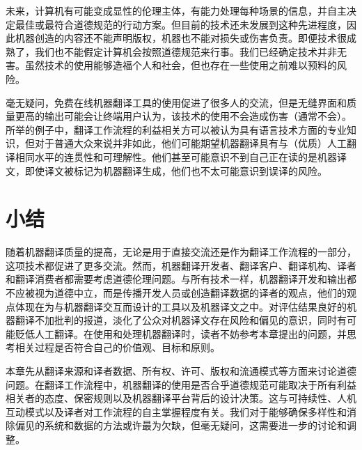 \documentclass[output=paper]{langscibook}
\begin{document}
未来，计算机有可能变成显性的伦理主体，有能力处理每种场景的信息，并自主决定最佳或最符合道德规范的行动方案。但目前的技术还未发展到这种先进程度，因此机器创造的内容还不能声明版权，机器也不能对损失或伤害负责。即便技术很成熟了，我们也不能假定计算机会按照道德规范来行事。我们已经确定技术并非无害。虽然技术的使用能够造福个人和社会，但也存在一些使用之前难以预料的风险。

毫无疑问，免费在线机器翻译工具的使用促进了很多人的交流，但是无缝界面和质量更高的输出可能会让终端用户认为，该技术的使用不会造成伤害（通常不会）。所举的例子中，翻译工作流程的利益相关方可以被认为具有语言技术方面的专业知识，但对于普通大众来说并非如此，他们可能期望机器翻译具有与（优质）人工翻译相同水平的连贯性和可理解性。他们甚至可能意识不到自己正在读的是机器译文，即使译文被标记为机器翻译生成，他们也不太可能意识到误译的风险。


\section{{{小结}}}\label{sec:moorkens:7}
随着机器翻译质量的提高，无论是用于直接交流还是作为翻译工作流程的一部分，这项技术都促进了更多交流。然而，机器翻译开发者、翻译客户、翻译机构、译者和翻译消费者都需要考虑道德伦理问题。与所有技术一样，机器翻译开发和输出都不应被视为道德中立，而是传播开发人员或创造翻译数据的译者的观点，他们的观点体现在为与机器翻译交互而设计的工具以及机器译文之中。对评估结果良好的机器翻译不加批判的报道，淡化了公众对机器译文存在风险和偏见的意识，同时有可能贬低人工翻译。在使用和处理机器翻译时，读者不妨参考本章提出的问题，并思考相关过程是否符合自己的价值观、目标和原则。

本章先从翻译来源和译者数据、所有权、许可、版权和流通模式等方面来讨论道德问题。在翻译工作流程中，机器翻译的使用是否合乎道德规范可能取决于所有利益相关者的态度、保密规则以及机器翻译平台背后的设计决策。这与可持续性、人机互动模式以及译者对工作流程的自主掌握程度有关。我们对于能够确保多样性和消除偏见的系统和数据的方法或许最为欠缺，但毫无疑问，这需要进一步的讨论和调整。\largerpage

\printbibliography[heading=subbibliography,notkeyword=this]
\end{document}
